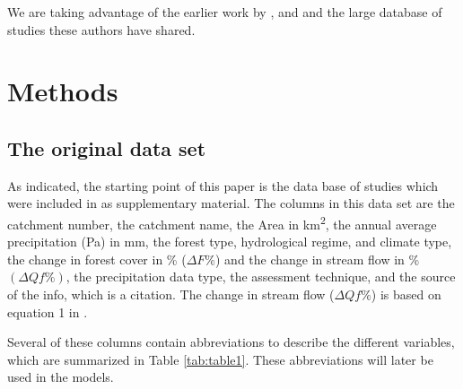 \documentclass[]{elsarticle} %
\begin{document}
We are taking advantage of the earlier work by \citet{zhang2017}, \citet{filoso2017} and \citet{zhou2015} and the large database of studies these authors have shared.

\hypertarget{methods}{%
\section{Methods}\label{methods}}

\hypertarget{the-original-data-set}{%
\subsection{The original data set}\label{the-original-data-set}}

As indicated, the starting point of this paper is the data base of studies which were included in \citet{zhang2017} as supplementary material. The columns in this data set are the catchment number, the catchment name, the Area in km\textsuperscript{2}, the annual average precipitation (Pa) in mm, the forest type, hydrological regime, and climate type, the change in forest cover in \% (\(\Delta F\%\)) and the change in stream flow in \% \((\Delta Qf\%)\), the precipitation data type, the assessment technique, and the source of the info, which is a citation. The change in stream flow (\(\Delta Qf\%\)) is based on equation 1 in \citet{zhang2017}.

Several of these columns contain abbreviations to describe the different variables, which are summarized in Table \ref{tab:table1}. These abbreviations will later be used in the models.
\end{document}

